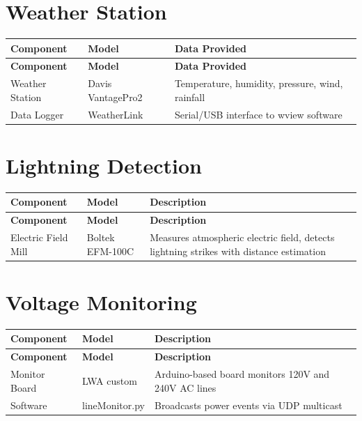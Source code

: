 \section{Weather Station}

\begin{longtable}{p{3cm}p{4cm}p{7cm}}
    \toprule
    \textbf{Component} & \textbf{Model} & \textbf{Data Provided} \\
    \midrule
    \endfirsthead
    \toprule
    \textbf{Component} & \textbf{Model} & \textbf{Data Provided} \\
    \midrule
    \endhead
    \bottomrule
    \endfoot

    Weather Station & Davis VantagePro2 & Temperature, humidity, pressure, wind, rainfall \\
    Data Logger & WeatherLink & Serial/USB interface to wview software \\

\end{longtable}

\section{Lightning Detection}

\begin{longtable}{p{3cm}p{3.5cm}p{7.5cm}}
    \toprule
    \textbf{Component} & \textbf{Model} & \textbf{Description} \\
    \midrule
    \endfirsthead
    \toprule
    \textbf{Component} & \textbf{Model} & \textbf{Description} \\
    \midrule
    \endhead
    \bottomrule
    \endfoot

    Electric Field Mill & Boltek EFM-100C & Measures atmospheric electric field, detects lightning strikes with distance estimation \\

\end{longtable}

\section{Voltage Monitoring}

\begin{longtable}{p{3cm}p{4cm}p{7cm}}
    \toprule
    \textbf{Component} & \textbf{Model} & \textbf{Description} \\
    \midrule
    \endfirsthead
    \toprule
    \textbf{Component} & \textbf{Model} & \textbf{Description} \\
    \midrule
    \endhead
    \bottomrule
    \endfoot

    Monitor Board & LWA custom & Arduino-based board monitors 120V and 240V AC lines \\
    Software & lineMonitor.py & Broadcasts power events via UDP multicast \\

\end{longtable}
